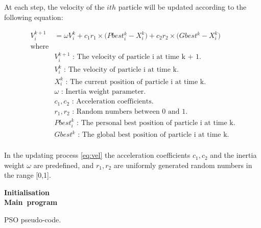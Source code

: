 \documentclass{pdfmx4020}
\begin{document}
    At each step, the velocity of the $ith$ particle will be updated according to the following equation:

    \begin{equation} \label{eq:vel}
      \begin{split}
        V_{i}^{k+1} & = \omega V_{i}^{k} + c_1 r_1 \times \Big( Pbest_{i}^{k} - X_{i}^{k} \Big) + c_2 r_2 \times \Big( Gbest^{k} - X_{i}^{k} \Big) \\
        \text{where} & \\
        & V_i^{k+1} \text{ : The velocity of particle i at time k + 1.} \\
        & V_i^k \text{ : The velocity of particle i at time k.} \\
        & X_i^k \text{ : The current position of particle i at time k.} \\
        & \omega \text{ : Inertia weight parameter.} \\
        & c_1, c_2 \text{ : Acceleration coefficients.} \\
        & r_1, r_2 \text{ : Random numbers between 0 and 1.} \\
        & Pbest_i^k \text{ : The personal best position of particle i at time k.} \\
        & Gbest^k \text{ : The global best position of particle i at time k.} \\
      \end{split}
    \end{equation}

    In the updating process \ref{eq:vel} the acceleration coefficients $c_1, c_2$ and the inertia weight $\omega$ are predefined, and $r_1, r_2$ are uniformly generated random numbers in the range [0,1].

    \begin{algorithm}[H] \label{eq:pso}
      \mbox{\textbf{Initialisation}} \\
      \mbox{\textbf{Main program}} \\      
      \caption{PSO pseudo-code.}
    \end{algorithm}
    
\end{document}
